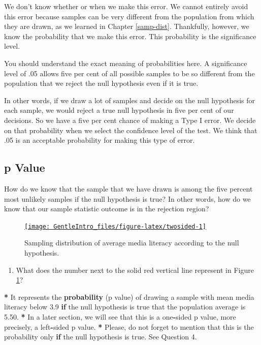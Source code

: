 \documentclass[a4paper]{book}
\newenvironment{Shaded}{\begin{snugshade}}{\end{snugshade}}
\newcommand{\KeywordTok}[1]{\textcolor[rgb]{0,0,0}{\textbf{#1}}}
\newcommand{\DecValTok}[1]{\textcolor[rgb]{0.00,0.00,0.00}{#1}}
\newcommand{\FloatTok}[1]{\textcolor[rgb]{0.00,0.00,0.00}{#1}}
\newcommand{\StringTok}[1]{\textcolor[rgb]{0.00,0.00,0.00}{#1}}
\newcommand{\ControlFlowTok}[1]{\textcolor[rgb]{0.00,0.00,0.00}{\textbf{#1}}}
\newcommand{\OperatorTok}[1]{\textcolor[rgb]{0.00,0.00,0.00}{\textbf{#1}}}
\newcommand{\NormalTok}[1]{#1}
\providecommand{\tightlist}{%
  \setlength{\itemsep}{0pt}\setlength{\parskip}{0pt}}
\theoremstyle{definition}
\theoremstyle{definition}
\theoremstyle{definition}
\theoremstyle{remark}
\begin{document}
We don't know whether or when we make this error. We cannot entirely
avoid this error because samples can be very different from the
population from which they are drawn, as we learned in Chapter
\ref{samp-dist}. Thankfully, however, we know the probability that we
make this error. This probability is the significance level.

You should understand the exact meaning of probabilities here. A
significance level of .05 allows five per cent of all possible samples
to be so different from the population that we reject the null
hypothesis even if it is true.

In other words, if we draw a lot of samples and decide on the null
hypothesis for each sample, we would reject a true null hypothesis in
five per cent of our decisions. So we have a five per cent chance of
making a Type I error. We decide on that probability when we select the
confidence level of the test. We think that .05 is an acceptable
probability for making this type of error.

\subsection{p Value}\label{pvalue}

How do we know that the sample that we have drawn is among the five
percent most unlikely samples if the null hypothesis is true? In other
words, how do we know that our sample statistic outcome is in the
rejection region?

\begin{figure}[H]
\href{http://82.196.4.233:3838/apps/twosided/}{\texttt{[image: GentleIntro\_files/figure-latex/twosided-1]} }\caption{Sampling distribution of average media literacy according to the null hypothesis.}\label{fig:twosided}
\end{figure}

\begin{enumerate}
\def\labelenumi{\arabic{enumi}.}
\tightlist
\item
  What does the number next to the solid red vertical line represent in
  Figure \ref{fig:twosided}?
\end{enumerate}

\begin{Shaded}
\begin{Highlighting}[]
\OperatorTok{*}\StringTok{ }\NormalTok{It represents the }\KeywordTok{probability}\NormalTok{ (p value) of drawing a sample with mean media}
\NormalTok{literacy below }\FloatTok{3.9} \ControlFlowTok{if}\NormalTok{ the null hypothesis is true that the population average}
\NormalTok{is }\FloatTok{5.50}\NormalTok{.}
\OperatorTok{*}\StringTok{ }\NormalTok{In a later section, we will see that this is a one}\OperatorTok{-}\NormalTok{sided p value, more}
\NormalTok{precisely, a left}\OperatorTok{-}\NormalTok{sided p value.}
\OperatorTok{*}\StringTok{ }\NormalTok{Please, do not forget to mention that this is the probability only }\ControlFlowTok{if}\NormalTok{ the}
\NormalTok{null hypothesis is true. See Question }\DecValTok{4}\NormalTok{.}
\end{Highlighting}
\end{Shaded}
\end{document}
